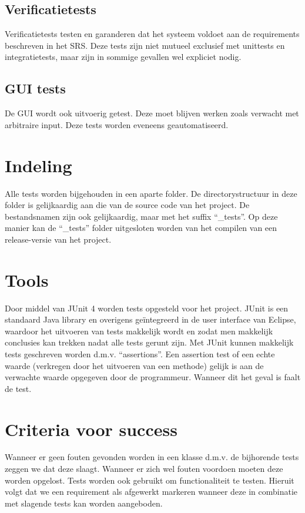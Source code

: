 \subsection{Verificatietests}
Verificatietests testen en garanderen dat het systeem voldoet aan de requirements beschreven in het SRS\cite{srs}. 
Deze tests zijn niet mutueel exclusief met unittests en integratietests, maar zijn in sommige gevallen wel expliciet nodig.

\subsection{GUI tests}
De GUI wordt ook uitvoerig getest. Deze moet blijven werken zoals verwacht met arbitraire input. Deze tests worden eveneens geautomatiseerd.

\section{Indeling}
Alle tests worden bijgehouden in een aparte folder. 
De directorystructuur in deze folder is gelijkaardig aan die van de source code van het project. 
De bestandsnamen zijn ook gelijkaardig, maar met het suffix ``\_tests''. 
Op deze manier kan de ``\_tests'' folder uitgesloten worden van het compilen van een release-versie van het project.

\section{Tools}
Door middel van JUnit 4\cite{junit} worden tests opgesteld voor het project. 
JUnit is een standaard Java library en overigens geïntegreerd in de user interface van Eclipse, waardoor het uitvoeren van tests makkelijk wordt en zodat men makkelijk conclusies kan trekken nadat alle tests gerunt zijn. 
Met JUnit kunnen makkelijk tests geschreven worden d.m.v. ``assertions''. 
Een assertion test of een echte waarde (verkregen door het uitvoeren van een methode) gelijk is aan de verwachte waarde opgegeven door de programmeur. Wanneer dit het geval is faalt de test. 	

\section{Criteria voor success}
Wanneer er geen fouten gevonden worden in een klasse d.m.v. de bijhorende tests zeggen we dat deze slaagt. 
Wanneer er zich wel fouten voordoen moeten deze worden opgelost. 
Tests worden ook gebruikt om functionaliteit te testen. 
Hieruit volgt dat we een requirement als afgewerkt markeren wanneer deze in combinatie met slagende tests kan worden aangeboden. 

